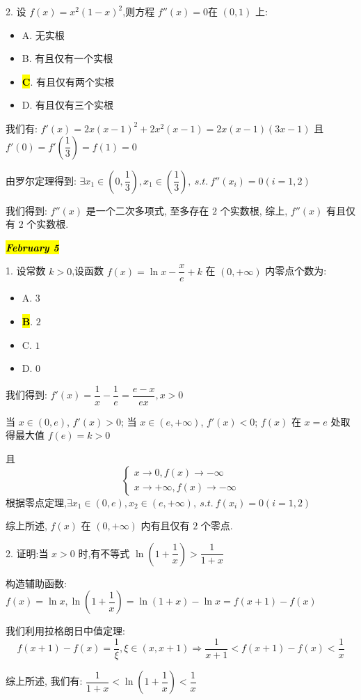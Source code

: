2. 设 $f(x)=x^{2}(1-x)^{2}$,则方程 $f''(x)=0$在 $(0,1)$ 上:
\begin{itemize}
	\item A. 无实根
	\item B. 有且仅有一个实根
	\item \hl{\textbf{C}}. 有且仅有两个实根
	\item D. 有且仅有三个实根
\end{itemize}
\begin{solution}

	我们有: $f'(x) = 2x(x-1)^{2}+2x^{2}(x-1) = 2x(x-1)(3x-1)$ 且 $f'(0) = f'(\dfrac{1}{3}) = f(1) = 0$

	由罗尔定理得到: $\exists x_{1}\in (0,\dfrac{1}{3}), x_{1}\in(\dfrac{1}{3}),\ s.t.\ f''(x_{i}) = 0(i = 1,2)$

	我们得到: $f''(x)$ 是一个二次多项式, 至多存在 $2$ 个实数根, 综上, $f''(x)$ 有且仅有 $2$ 个实数根.
\end{solution}

\hl{\textbf{\textit{February 5}}}

1. 设常数 $k>0$,设函数 $f(x)=\ln x-\dfrac{x}{e}+k$ 在 $(0,+\infty)$ 内零点个数为:
\begin{itemize}
	\item A. $3$
	\item \hl{\textbf{B}}. $2$
	\item C. $1$
	\item D. $0$
\end{itemize}
\begin{solution}

	我们得到: $f'(x) = \dfrac{1}{x}-\dfrac{1}{e} = \dfrac{e-x}{ex}, x > 0$

	当 $x\in(0,e)$, $f'(x) > 0$; 当 $x\in(e,+\infty)$, $f'(x) < 0$; $f(x)$ 在 $x = e$ 处取得最大值 $f(e) = k > 0$

	且 $$\begin{cases}
		x\to 0, f(x)\to -\infty\\
		x\to +\infty, f(x)\to -\infty
	\end{cases}$$
	根据零点定理,$\exists x_{1}\in(0,e),x_{2}\in(e,+\infty),\ s.t.\ f(x_{i}) = 0(i = 1,2)$

	综上所述, $f(x)$ 在 $(0,+\infty)$ 内有且仅有 $2$ 个零点.
\end{solution}

2. 证明:当 $x>0$ 时,有不等式 $\ln(1+\dfrac{1}{x})>\dfrac{1}{1+x}$
\begin{solution}
	
	构造辅助函数: $f(x) = \ln x, \ln(1+\dfrac{1}{x}) = \ln(1+x) -\ln x = f(x+1)-f(x)$

	我们利用拉格朗日中值定理: $$f(x+1)-f(x) = \dfrac{1}{\xi}, \xi\in(x,x+1)\Rightarrow \dfrac{1}{x+1}< f(x+1)-f(x) < \dfrac{1}{x}$$

	综上所述, 我们有: $\dfrac{1}{1+x} < \ln(1+\dfrac{1}{x}) < \dfrac{1}{x}$
\end{solution}

